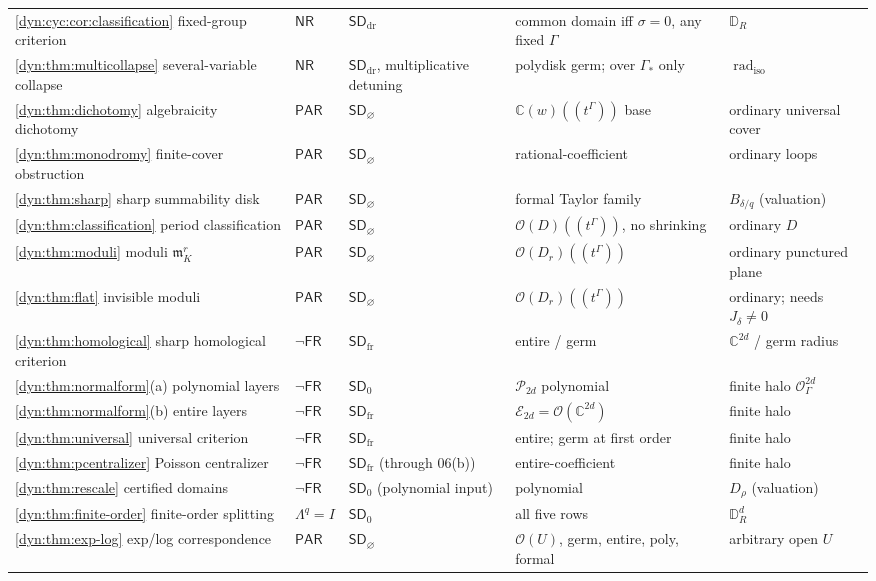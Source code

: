 \documentclass[11pt,letterpaper]{article}
\theoremstyle{definition}
\theoremstyle{remark}
\newcommand{\C}{\mathbb C}
\newcommand{\OO}{\mathcal O}
\newcommand{\EE}{\mathscr E}
\newcommand{\PP}{\mathscr P}
\newcommand{\m}{\mathfrak m}
\newcommand{\radiso}{\operatorname{rad}_{\mathrm{iso}}}
\newcommand{\sdz}{\mathsf{SD}_{0}}
\newcommand{\sddr}{\mathsf{SD}_{\mathrm{dr}}}
\newcommand{\sdfr}{\mathsf{SD}_{\mathrm{fr}}}
\newcommand{\sdno}{\mathsf{SD}_{\varnothing}}
\newcommand{\nres}{\mathsf{NR}}
\newcommand{\fres}{\mathsf{FR}}
\newcommand{\pares}{\mathsf{PAR}}
\numberwithin{equation}{section}
\begin{document}
\begin{longtable}{@{}P{0.24\textwidth}P{0.10\textwidth}P{0.11\textwidth}P{0.22\textwidth}P{0.20\textwidth}@{}}
\cref{dyn:cyc:cor:classification} fixed-group criterion
& $\nres$ & $\sddr$ & common domain iff $\sigma=0$, any fixed $\Gamma$
& $\mathbb D_R$\\
\cref{dyn:thm:multicollapse} several-variable collapse
& $\nres$ & $\sddr$, multiplicative detuning & polydisk germ; over
$\Gamma_{*}$ only & $\radiso$\\
\cref{dyn:thm:dichotomy} algebraicity dichotomy
& $\pares$ & $\sdno$ & $\C(w)((t^\Gamma))$ base & ordinary universal cover\\
\cref{dyn:thm:monodromy} finite-cover obstruction
& $\pares$ & $\sdno$ & rational-coefficient & ordinary loops\\
\cref{dyn:thm:sharp} sharp summability disk
& $\pares$ & $\sdno$ & formal Taylor family & $B_{\delta/q}$ (valuation)\\
\cref{dyn:thm:classification} period classification
& $\pares$ & $\sdno$ & $\OO(D)((t^\Gamma))$, no shrinking & ordinary $D$\\
\cref{dyn:thm:moduli} moduli $\m_K^{r}$
& $\pares$ & $\sdno$ & $\OO(D_r)((t^\Gamma))$ & ordinary punctured plane\\
\cref{dyn:thm:flat} invisible moduli
& $\pares$ & $\sdno$ & $\OO(D_r)((t^\Gamma))$ & ordinary; needs $J_\delta\ne0$\\
\cref{dyn:thm:homological} sharp homological criterion
& $\lnot\fres$ & $\sdfr$ & entire / germ & $\C^{2d}$ / germ radius\\
\cref{dyn:thm:normalform}(a) polynomial layers
& $\lnot\fres$ & $\sdz$ & $\PP_{2d}$ polynomial & finite halo $\OO_\Gamma^{2d}$\\
\cref{dyn:thm:normalform}(b) entire layers
& $\lnot\fres$ & $\sdfr$ & $\EE_{2d}=\OO(\C^{2d})$ & finite halo\\
\cref{dyn:thm:universal} universal criterion
& $\lnot\fres$ & $\sdfr$ & entire; germ at first order & finite halo\\
\cref{dyn:thm:pcentralizer} Poisson centralizer
& $\lnot\fres$ & $\sdfr$ (through 06(b)) & entire-coefficient & finite halo\\
\cref{dyn:thm:rescale} certified domains
& $\lnot\fres$ & $\sdz$ (polynomial input) & polynomial & $D_{\rho}$ (valuation)\\
\cref{dyn:thm:finite-order} finite-order splitting
& $\Lambda^{q}=I$ & $\sdz$ & all five rows & $\mathbb D_R^{d}$\\
\cref{dyn:thm:exp-log} exp/log correspondence
& $\pares$ & $\sdno$ & $\OO(U)$, germ, entire, poly, formal & arbitrary open $U$\\

\end{longtable}
\end{document}
